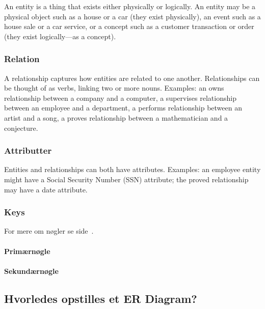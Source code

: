 An entity is a thing that exists either physically or logically. An entity may be a physical object such as a house or a car (they exist physically), an event such as a house sale or a car service, or a concept such as a customer transaction or order (they exist logically—as a concept).

\subsubsection{Relation}
A relationship captures how entities are related to one another. Relationships can be thought of as verbs, linking two or more nouns. Examples: an owns relationship between a company and a computer, a supervises relationship between an employee and a department, a performs relationship between an artist and a song, a proves relationship between a mathematician and a conjecture.

\subsubsection{Attributter}
Entities and relationships can both have attributes. Examples: an employee entity might have a Social Security Number (SSN) attribute; the proved relationship may have a date attribute.

\subsubsection{Keys}

For mere om nøgler se side~\pageref{sec:keys}.

\paragraph{Primærnøgle}
\paragraph{Sekundærnøgle}

\subsection{Hvorledes opstilles et ER Diagram?}




























